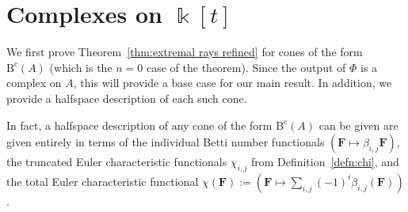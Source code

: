 \documentclass[12pt]{amsart}
\theoremstyle{definition}
\theoremstyle{remark}
\newcommand{\kk}{\Bbbk}
\newcommand{\cc}{c}
\newcommand{\FF}{\mathbf{F}}
\newcommand{\Gbull}{\mathbf{G}}
\newcommand{\BBQ}{\mathrm{B}}
\begin{document}
\section{Complexes on $\kk[t]$}\label{sec:A}
We first prove Theorem~\ref{thm:extremal rays refined} for cones of the form $\BBQ^{\cc}(A)$ (which is the $n=0$ case of the theorem).
Since the output of $\Phi$ is a complex on $A$, this will provide a base case for our main result.  In addition, we provide a halfspace description of each such cone.


In fact, a halfspace description of any cone of the form $\BBQ^{\cc}(A)$ can be given are given entirely in terms of the individual Betti number functionals $(\FF\mapsto \beta_{i,j}\FF)$, the truncated Euler characteristic functionals $\chi_{i,j}$ from Definition~\ref{defn:chi}, and the total Euler characteristic functional $\chi(\FF):=(\FF\mapsto \sum_{i,j}(-1)^i \beta_{i,j}(\FF))$.  
\end{document}

